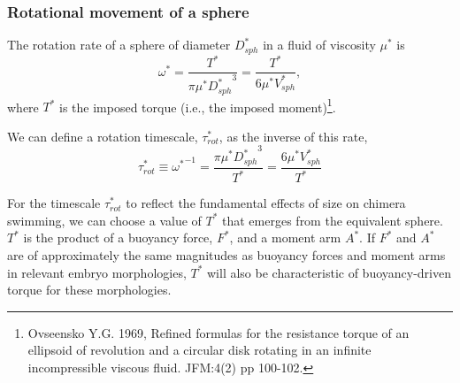 \documentclass[10pt,a4paper]{article}
\begin{document}
\subsubsection{Rotational movement of a sphere}\label{RotSect}
The rotation rate of a sphere of diameter $D_{sph}^*$ in a fluid of viscosity $\mu^*$ is 
\begin{equation}\label{rot1}
	\omega^* = \frac{T^*}{\pi \mu^* {D_{sph}^*}^3} = \frac{T^*}{6 \mu^* V_{sph}^*},	
\end{equation}
where $T^*$ is the imposed torque (i.e., the imposed moment)\footnote{Ovseensko Y.G. 1969, Refined formulas for the resistance torque of an ellipsoid of revolution and a circular disk rotating in an infinite incompressible viscous fluid. JFM:4(2) pp 100-102.}.

We can define a rotation timescale, $\tau^*_{rot}$, as the inverse of this rate,
\begin{equation}\label{tau1}
	\tau^*_{rot} \equiv {\omega^*}^{-1} = \frac{\pi \mu^* {D_{sph}^*}^3}{T^*} = \frac{6 \mu^* V_{sph}^*}{T^*}
\end{equation}

For the timescale $\tau^*_{rot}$ to reflect the fundamental effects of size on chimera swimming, we can choose a value of $T^*$ that emerges from the equivalent sphere.
$T^*$ is the product of a buoyancy force, $F^*$, and a moment arm $A^*$.
If $F^*$ and $A^*$ are of approximately the same magnitudes as buoyancy forces and moment arms in relevant embryo morphologies, $T^*$ will also be characteristic of buoyancy-driven torque for these morphologies.
\end{document}

